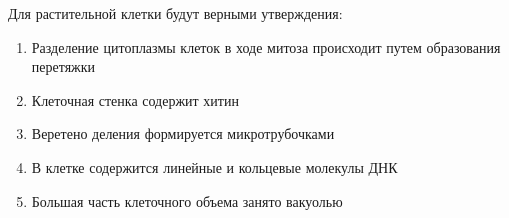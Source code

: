 
Для растительной клетки будут верными
утверждения:

\begin{enumerate}
    \item Разделение цитоплазмы клеток в ходе митоза происходит путем образования перетяжки
    \item Клеточная стенка содержит хитин 
    \item Веретено деления формируется микротрубочками
    \item В клетке содержится линейные и кольцевые молекулы ДНК
    \item Большая часть клеточного объема занято вакуолью
\end{enumerate}


\explanationSection

